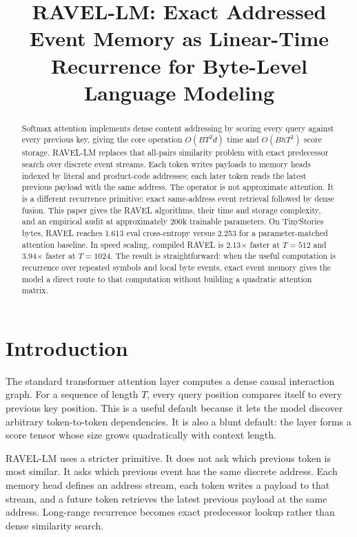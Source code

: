 \documentclass[10pt]{article}
\title{RAVEL-LM: Exact Addressed Event Memory as Linear-Time Recurrence for Byte-Level Language Modeling}
\author{}
\date{}
\begin{document}
\maketitle
\vspace{-2em}

\begin{abstract}
Softmax attention implements dense content addressing by scoring every query against every previous key, giving the core operation $O(BT^2d)$ time and $O(BhT^2)$ score storage. RAVEL-LM replaces that all-pairs similarity problem with exact predecessor search over discrete event streams. Each token writes payloads to memory heads indexed by literal and product-code addresses; each later token reads the latest previous payload with the same address. The operator is not approximate attention. It is a different recurrence primitive: exact same-address event retrieval followed by dense fusion. This paper gives the RAVEL algorithms, their time and storage complexity, and an empirical audit at approximately 200k trainable parameters. On TinyStories bytes, RAVEL reaches 1.613 eval cross-entropy versus 2.253 for a parameter-matched attention baseline. In speed scaling, compiled RAVEL is 2.13$\times$ faster at $T=512$ and 3.94$\times$ faster at $T=1024$. The result is straightforward: when the useful computation is recurrence over repeated symbols and local byte events, exact event memory gives the model a direct route to that computation without building a quadratic attention matrix.
\end{abstract}

\section{Introduction}

The standard transformer attention layer computes a dense causal interaction graph. For a sequence of length $T$, every query position compares itself to every previous key position. This is a useful default because it lets the model discover arbitrary token-to-token dependencies. It is also a blunt default: the layer forms a score tensor whose size grows quadratically with context length.

RAVEL-LM uses a stricter primitive. It does not ask which previous token is most similar. It asks which previous event has the same discrete address. Each memory head defines an address stream, each token writes a payload to that stream, and a future token retrieves the latest previous payload at the same address. Long-range recurrence becomes exact predecessor lookup rather than dense similarity search.
\end{document}
